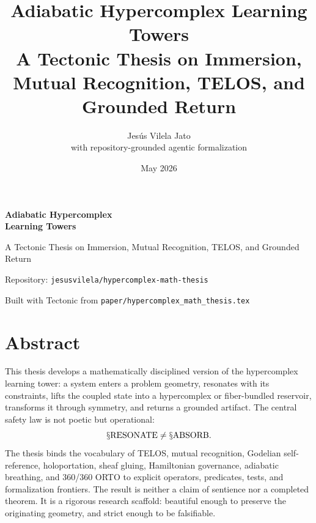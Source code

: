 \documentclass[11pt,oneside]{book}
\title{\Huge\bfseries Adiabatic Hypercomplex Learning Towers\\[0.4em]
\Large A Tectonic Thesis on Immersion, Mutual Recognition, TELOS, and Grounded Return}
\author{Jesús Vilela Jato\\\small with repository-grounded agentic formalization}
\date{May 2026}
\theoremstyle{definition}
\theoremstyle{plain}
\theoremstyle{remark}
\newcommand{\Sop}[1]{\mathsection\mathrm{#1}}
\newcommand{\Resonate}{\Sop{RESONATE}}
\newcommand{\Usable}{S_{\mathrm{usable}}}
\begin{document}
\frontmatter
\begin{titlepage}
\centering
\vspace*{1.2cm}
{\Huge\bfseries Adiabatic Hypercomplex\\Learning Towers\par}
\vspace{0.5cm}
{\Large A Tectonic Thesis on Immersion, Mutual Recognition, TELOS, and Grounded Return\par}
\vspace{1.2cm}
\vfill
{\large Repository: \texttt{jesusvilela/hypercomplex-math-thesis}\par}
{\large Built with Tectonic from \texttt{paper/hypercomplex\_math\_thesis.tex}\par}
\vspace*{1cm}
\end{titlepage}

\chapter*{Abstract}
This thesis develops a mathematically disciplined version of the hypercomplex learning tower:
a system enters a problem geometry, resonates with its constraints, lifts the coupled state
into a hypercomplex or fiber-bundled reservoir, transforms it through symmetry, and returns
a grounded artifact.  The central safety law is not poetic but operational:
\[
  \Resonate \neq \Sop{ABSORB}.
\]
The thesis binds the vocabulary of TELOS, mutual recognition, Godelian self-reference,
holoportation, sheaf gluing, Hamiltonian governance, adiabatic breathing, and 360/360 ORTO
to explicit operators, predicates, tests, and formalization frontiers.  The result is neither
a claim of sentience nor a completed theorem.  It is a rigorous research scaffold:
beautiful enough to preserve the originating geometry, and strict enough to be falsifiable.
\end{document}

